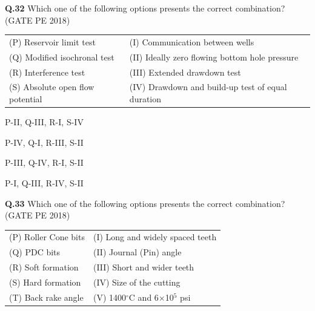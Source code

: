 \documentclass[12pt,a4paper]{article}
\begin{document}
\vspace{1cm}

\noindent\textbf{Q.32} Which one of the following options presents the correct combination? \hfill (GATE PE 2018)

\vspace{0.3cm}

\begin{tabular}{ll}
(P) Reservoir limit test         & (I) Communication between wells \\
(Q) Modified isochronal test     & (II) Ideally zero flowing bottom hole pressure \\
(R) Interference test            & (III) Extended drawdown test \\
(S) Absolute open flow potential & (IV) Drawdown and build-up test of equal duration \\
\end{tabular}

\vspace{0.3cm}

\begin{enumerate}[label=(\Alph*)] 
\begin{multicols}{2}
	\item P-II, Q-III, R-I, S-IV \item P-IV, Q-I, R-III, S-II 
	\item P-III, Q-IV, R-I, S-II \item P-I, Q-III, R-IV, S-II 
\end{multicols}
\end{enumerate}
\pagebreak
\noindent\textbf{Q.33} Which one of the following options presents the correct combination? \hfill (GATE PE 2018)

\vspace{0.3cm}

\begin{tabular}{ll}
(P) Roller Cone bits    & (I) Long and widely spaced teeth \\
(Q) PDC bits            & (II) Journal (Pin) angle \\
(R) Soft formation      & (III) Short and wider teeth \\
(S) Hard formation      & (IV) Size of the cutting \\
(T) Back rake angle     & (V) 1400$^\circ$C and 6$\times$10$^5$ psi \\
\end{tabular}

\vspace{0.3cm}
\end{document}
